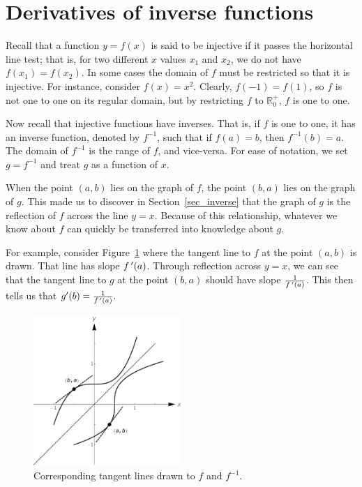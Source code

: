 \section{Derivatives of inverse functions}\label{sec:deriv_inverse_function}

Recall that a function $y=f(x)$ is said to be injective if it passes the horizontal line test; that is, for two different $x$ values $x_1$ and $x_2$, we do not have $f(x_1)=f(x_2)$. In some cases the domain of $f$ must be restricted so that it is injective. For instance, consider $f(x)=x^2$. Clearly, $f(-1)= f(1)$, so $f$ is not one to one on its regular domain, but by restricting $f$ to $\mathbb{R}^+_0$, $f$ is one to one.

Now recall that injective functions have inverses. That is, if $f$ is one to one, it has an inverse function, denoted by $f^{-1}$, such that if $f(a)=b$, then $f^{-1}(b) = a$. The domain of $f^{-1}$ is the range of $f$, and vice-versa. For ease of notation, we set $g=f^{-1}$ and treat $g$ as a function of $x$.

When the point $(a,b)$ lies on the graph of $f$, the point $(b,a)$ lies on the graph of $g$. This made us to discover in Section~\ref{sec_inverse} that the graph of $g$ is the reflection of $f$ across the line $y=x$. Because of this relationship, whatever we know about $f$ can quickly be transferred into knowledge about $g$.

For example, consider Figure~\ref{fig_diff_10} where the tangent line to $f$ at the point $(a,b)$ is drawn. That line has slope $f\,'(a)$. Through reflection across $y=x$, we can see that the tangent line to $g$ at the point $(b,a)$ should have slope $\frac{1}{f\,'(a)}$. This then tells us that $ g'(b) = \frac{1}{f\,'(a)}.$


\begin{figure}
	\begin{center}
			\includegraphics[width=0.5\textwidth]{fig_diff_10}
	\caption{Corresponding tangent lines drawn to $f$ and $f^{-1}$.}
	\label{fig_diff_10}
	\end{center}
\end{figure}

